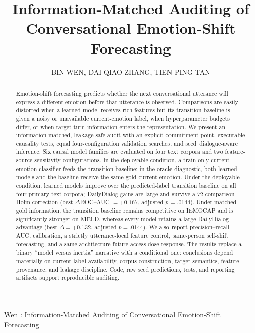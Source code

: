 \documentclass{ieeeaccess}
\begin{document}

\title{Information-Matched Auditing of Conversational Emotion-Shift Forecasting}

\author{\uppercase{Bin Wen},
\uppercase{Dai-Qiao Zhang},
\uppercase{Tien-Ping Tan}}
\address[1]{School of Computer Sciences, Universiti Sains Malaysia, 11800 Gelugor, Penang,
Malaysia (e-mail: wenbin@student.usm.my; tienping@usm.my)}
\address[2]{School of Mathematical Sciences, Universiti Sains Malaysia, 11800 Gelugor, Penang,
Malaysia (e-mail: zhangdaiqiao24@student.usm.my)}
{Wen \headeretal: Information-Matched Auditing of Conversational Emotion-Shift Forecasting}

\begin{abstract}
Emotion-shift forecasting predicts whether the next conversational utterance will express a
different emotion before that utterance is observed. Comparisons are easily distorted when a
learned model receives rich features but its transition baseline is given a noisy or unavailable
current-emotion label, when hyperparameter budgets differ, or when target-turn information enters
the representation. We present an information-matched, leakage-safe audit with an explicit
commitment point, executable causality tests, equal four-configuration validation searches, and
seed--dialogue-aware inference. Six causal model families are evaluated on four text corpora and
two feature-source sensitivity configurations. In the deployable condition, a train-only current
emotion classifier feeds the transition baseline; in the oracle diagnostic, both learned models
and the baseline receive the same gold current emotion. Under the deployable condition, learned
models improve over the predicted-label transition baseline on all four primary text corpora;
DailyDialog gains are large and survive a 72-comparison Holm correction (best
$\Delta$ROC--AUC $=+0.167$, adjusted $p=.0144$). Under matched gold information, the transition
baseline remains competitive on IEMOCAP and is significantly stronger on MELD, whereas every
model retains a large DailyDialog advantage (best $\Delta=+0.132$, adjusted $p=.0144$). We also
report precision--recall AUC, calibration, a strictly utterance-local feature control,
same-person self-shift forecasting, and a same-architecture future-access dose response. The
results replace a binary ``model versus inertia'' narrative with a conditional one: conclusions
depend materially on current-label availability, corpus construction, target semantics, feature
provenance, and leakage discipline. Code, raw seed predictions, tests, and reporting artifacts
support reproducible auditing.
\end{abstract}
\end{document}
